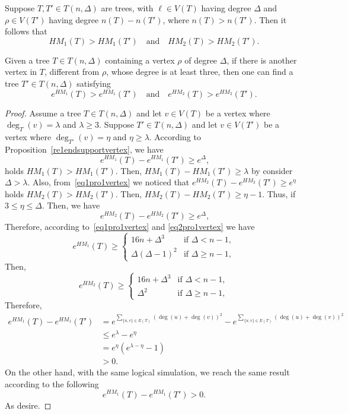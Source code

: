 \documentclass[10pt,a4paper]{amsart}
\begin{document}
\begin{proposition}\label{re1endsupportvertex}
Suppose $T, T' \in T(n, \Delta)$ are trees, with $\ell \in V(T)$ having degree $\Delta$ and $\rho \in V(T')$ having degree $n(T) - n(T')$, where $n(T) > n(T')$. Then it follows that
\[
HM_{1}(T) > HM_{1}(T') \quad \text{and} \quad HM_{2}(T) > HM_{2}(T').
\]
\end{proposition}

\begin{proposition}\label{pro1vertex}
Given a tree $T \in T(n, \Delta)$ containing a vertex $\rho$ of degree $\Delta$, if there is another vertex in $T$, different from $\rho$, whose degree is at least three, then one can find a tree $T' \in T(n, \Delta)$ satisfying
\[
e^{HM_1}(T) > e^{HM_1}(T') \quad \text{and} \quad e^{HM_2}(T) > e^{HM_2}(T').
\]
\end{proposition}

\begin{proof}
Assume a tree $T \in T(n, \Delta)$ and let $v\in V(T)$ be a vertex where $\deg_T(v)=\lambda$ and $\lambda\geqslant 3$. Suppose $T' \in T(n, \Delta)$ and  let $v\in V(T')$ be a vertex where $\deg_{T'}(v)=\eta$ and $\eta\geqslant \lambda$.
According to Proposition~\ref{re1endsupportvertex}, we have 
\begin{equation}~\label{eq1pro1vertex}
e^{HM_1}(T)- e^{HM_1}(T')\geqslant e^{\Delta}, 
\end{equation}
holds $HM_1(T) > HM_1(T')$. Then, $HM_1(T)-HM_1(T')\geqslant \lambda$ by consider $\Delta>\lambda$.  Also, from~\eqref{eq1pro1vertex} we noticed that $e^{HM_2}(T)- e^{HM_2}(T')\geqslant e^{\eta}$ holds $HM_2(T) > HM_2(T')$. Then, $HM_2(T)-HM_2(T')\geqslant \eta-1$. Thus, if $3\leqslant \eta \leqslant \Delta$. Then, we have 
\begin{equation}~\label{eq2pro1vertex}
e^{HM_2}(T)- e^{HM_2}(T')\geqslant e^{\Delta}, 
\end{equation}
Therefore, according to~\eqref{eq1pro1vertex} and \eqref{eq2pro1vertex} we have 
\[
e^{HM_1}(T) \geq
\begin{cases}
16 n + \Delta^{3}  & \text{if } \Delta < n-1, \\
\Delta (\Delta - 1)^2 & \text{if } \Delta \geqslant n-1,
\end{cases}
\]
Then, 
\[
e^{HM_2}(T) \geq
\begin{cases}
16 n + \Delta^{3} & \text{if } \Delta < n-1, \\
\Delta^{2} & \text{if } \Delta \geqslant n-1,
\end{cases}
\]
Therefore,
\begin{align*}
e^{HM_1}(T)- e^{HM_1}(T') &= e^{\sum_{\{u,v\} \in E(T)} \left( \deg(u) + \deg(v) \right)^2}-e^{\sum_{\{u,v\} \in E(T)} \left( \deg(u) + \deg(v) \right)^2}\\
&\leqslant e^{\lambda}-e^{\eta}\\
&=e^{\eta}(e^{\lambda-\eta}-1)\\
&>0.
\end{align*}
On the other hand, with the same logical simulation, we reach the same result according to the following
\[
e^{HM_1}(T)- e^{HM_1}(T')>0.
\]
As desire.
\end{proof}
\end{document}
